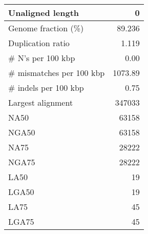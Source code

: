 \documentclass[12pt,a4paper]{article}
\begin{document}
\begin{table}[ht]
\begin{center}
\begin{tabular}{|l*{1}{|r}|}
Unaligned length & 0 \\ \hline
Genome fraction (\%) & 89.236 \\ \hline
Duplication ratio & 1.119 \\ \hline
\# N's per 100 kbp & 0.00 \\ \hline
\# mismatches per 100 kbp & 1073.89 \\ \hline
\# indels per 100 kbp & 0.75 \\ \hline
Largest alignment & 347033 \\ \hline
NA50 & 63158 \\ \hline
NGA50 & 63158 \\ \hline
NA75 & 28222 \\ \hline
NGA75 & 28222 \\ \hline
LA50 & 19 \\ \hline
LGA50 & 19 \\ \hline
LA75 & 45 \\ \hline
LGA75 & 45 \\ \hline
\end{tabular}
\end{center}
\end{table}
\end{document}
